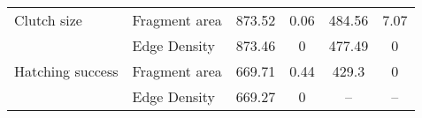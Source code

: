 \documentclass[10pt, twoside]{book} %
\begin{document}
\begin{landscape}
\begin{table}
\begin{center}
\begin{footnotesize}
\begin{tabular}{l l c c c c}
					Clutch size & Fragment area & 873.52 & 0.06 & 	484.56 & 7.07\\
					&Edge Density & 873.46 & 0 & 	477.49 & 0\\
					
					Hatching success & Fragment area & 669.71 & 0.44 & 	429.3 & 0\\
					&Edge Density & 669.27 & 0 & 	-- & --\\
					
					
					
					\bottomrule
				\end{tabular}\endgroup
			\end{footnotesize}
		\end{center}
	\end{table}
\end{landscape}
\clearpage
\end{document}
